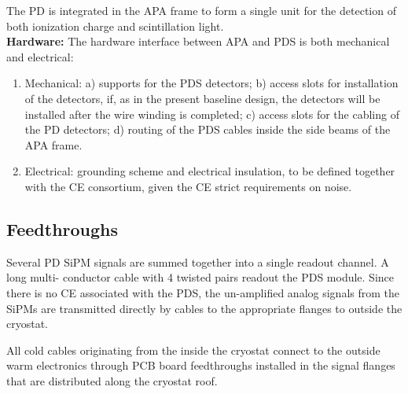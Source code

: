 

The PD is integrated in the APA frame to form a single unit for the detection of both ionization charge and scintillation light.\\

\textbf{Hardware:}
The hardware interface between APA and PDS is both mechanical and electrical: 
\begin{enumerate}
\item Mechanical: a) supports for the PDS detectors; b) access slots for installation of the detectors, if, as in the present baseline design, the detectors will be installed after the wire winding is completed; c) access slots for the cabling of the PD detectors; d) routing of the PDS cables inside the side beams of the APA frame.
\item Electrical: grounding scheme and electrical insulation, to be defined together with the CE consortium, given the CE strict requirements on noise.
\end{enumerate}


\subsection{Feedthroughs}
\label{sec:fdsp-pd-intfc-feed}

Several PD SiPM signals are summed together into a single readout channel. A long multi- conductor cable with 4 twisted pairs readout the PDS module. Since there is no CE associated with the PDS, the un-amplified analog signals from the SiPMs are transmitted directly by cables to the appropriate flanges to outside the cryostat. 

All cold cables originating from the inside the cryostat connect to the outside warm electronics through PCB board feedthroughs installed in the signal flanges that are distributed along the cryostat roof.

